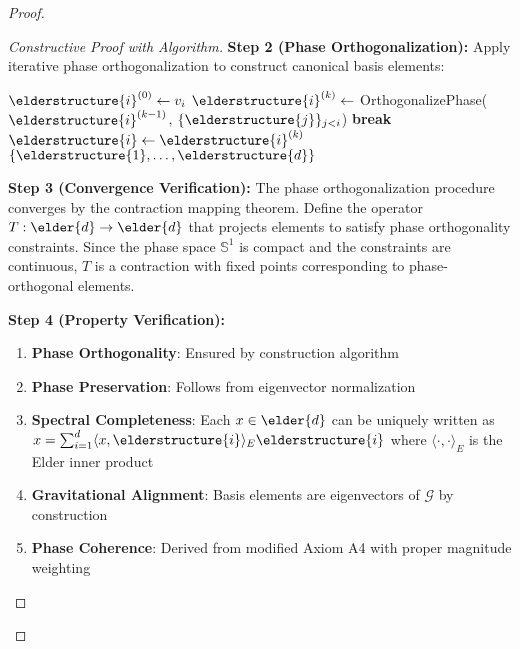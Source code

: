 \begin{proof}
\begin{proof}[Constructive Proof with Algorithm]
\textbf{Step 2 (Phase Orthogonalization):}
Apply iterative phase orthogonalization to construct canonical basis elements:
\begin{algorithm}[H]
\begin{algorithmic}[1]
        \State $\elderstructure{i}^{(0)} \leftarrow v_i$ 
            \State $\elderstructure{i}^{(k)} \leftarrow$ OrthogonalizePhase($\elderstructure{i}^{(k-1)}$, $\{\elderstructure{j}\}_{j<i}$)
                \State \textbf{break} 
            \EndIf
        \EndFor
        \State $\elderstructure{i} \leftarrow \elderstructure{i}^{(k)}$
    \EndFor
    \State \Return $\{\elderstructure{1}, \ldots, \elderstructure{d}\}$
\EndProcedure
\end{algorithmic}
\end{algorithm}

\textbf{Step 3 (Convergence Verification):}
The phase orthogonalization procedure converges by the contraction mapping theorem. Define the operator $T: \elder{d} \rightarrow \elder{d}$ that projects elements to satisfy phase orthogonality constraints. Since the phase space $\mathbb{S}^1$ is compact and the constraints are continuous, $T$ is a contraction with fixed points corresponding to phase-orthogonal elements.

\textbf{Step 4 (Property Verification):}
\begin{enumerate}
    \item \textbf{Phase Orthogonality}: Ensured by construction algorithm
    \item \textbf{Phase Preservation}: Follows from eigenvector normalization
    \item \textbf{Spectral Completeness}: Each $x \in \elder{d}$ can be uniquely written as $x = \sum_{i=1}^{d} \langle x, \elderstructure{i} \rangle_E \elderstructure{i}$ where $\langle \cdot, \cdot \rangle_E$ is the Elder inner product
    \item \textbf{Gravitational Alignment}: Basis elements are eigenvectors of $\mathcal{G}$ by construction
    \item \textbf{Phase Coherence}: Derived from modified Axiom A4 with proper magnitude weighting
\end{enumerate}


\end{proof}
\end{proof}
